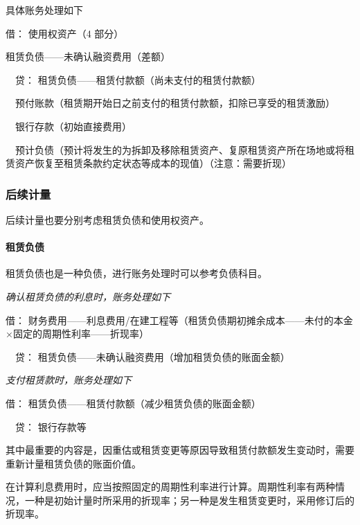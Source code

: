 \documentclass[UTF8,12pt]{ctexart}
\newenvironment{Dr}{\noindent 借：}{\par}
\newenvironment{Cr}{\noindent \ \ 贷：}{\par}
\numberwithin{equation}{section} %
\numberwithin{figure}{section}
\numberwithin{table}{section}
\begin{document}
	具体账务处理如下
	
	\begin{Dr}
		使用权资产（4 部分）
		
		租赁负债——未确认融资费用（差额）
	\end{Dr}
	\begin{Cr}
		租赁负债——租赁付款额（尚未支付的租赁付款额）
		
		\ \ 预付账款（租赁期开始日之前支付的租赁付款额，扣除已享受的租赁激励） 
		
		\ \ 银行存款（初始直接费用）
		
		\ \ 预计负债（预计将发生的为拆卸及移除租赁资产、复原租赁资产所在场地或将租赁资产恢复至租赁条款约定状态等成本的现值）（注意：需要折现）
	\end{Cr}
	
	
	
	\subsubsection{后续计量}
	后续计量也要分别考虑租赁负债和使用权资产。
	
	\paragraph{租赁负债}
	租赁负债也是一种负债，进行账务处理时可以参考负债科目。
	
	\textit{确认租赁负债的利息时，账务处理如下}
	
	\begin{Dr}
		财务费用——利息费用/在建工程等（租赁负债期初摊余成本——未付的本金×固定的周期性利率——折现率）
	\end{Dr}
	\begin{Cr}
		租赁负债——未确认融资费用（增加租赁负债的账面金额）
	\end{Cr}

	\textit{支付租赁款时，账务处理如下}
	
	\begin{Dr}
		租赁负债——租赁付款额（减少租赁负债的账面金额）
	\end{Dr}
	\begin{Cr}
		银行存款等
	\end{Cr}

	其中最重要的内容是，因重估或租赁变更等原因导致租赁付款额发生变动时，需要重新计量租赁负债的账面价值。
	
	在计算利息费用时，应当按照固定的周期性利率进行计算。周期性利率有两种情况，一种是初始计量时所采用的折现率；另一种是发生租赁变更时，采用修订后的折现率。
	
\end{document}
